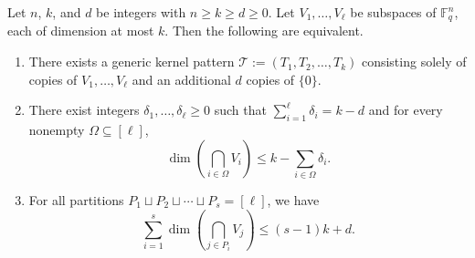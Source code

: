 \documentclass[10pt,a4paper]{amsart}
\newcommand{\F}{\mathbb{F}}
\begin{document}
\begin{lemma}\label{order-l-cha}
Let $n$, $k$, and $d$ be integers with $n\ge k\geq d\geq 0$.
Let $V_1,\ldots,V_\ell$ be subspaces of $\F_q^n$, each of dimension at most $k$. Then the following are equivalent. 
\begin{enumerate}
\item\label{eqiv:1} There exists a generic kernel pattern $\mathcal{T}:=(T_1,T_2,\dots,T_k)$
consisting solely of copies of $V_1,\ldots,V_\ell$ and an additional $d$ copies of $\{0\}$.
\item\label{eqiv:2} There exist integers $\delta_1,\ldots,\delta_\ell\geq 0$ such that $\sum_{i=1}^{\ell}\delta_i=k-d$ and for every nonempty $\Omega\subseteq [\ell]$, 
\begin{equation}\label{eq:cond2}
\dim\left(\bigcap_{i\in \Omega}V_i\right)\leq k-\sum_{i\in \Omega}\delta_i.
\end{equation}
\item \label{eqiv:3} For all partitions $P_1\sqcup P_2\sqcup\cdots\sqcup P_s=[\ell]$, we have 
\begin{equation}\label{eq:cond3}
\sum_{i=1}^s\dim\left(\bigcap_{j\in P_i} V_j\right)\leq (s-1)k+d.
\end{equation}
\end{enumerate}
\end{lemma}
\end{document}
